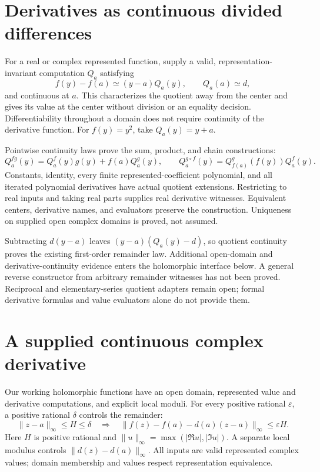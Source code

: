 \section{Derivatives as continuous divided differences}
For a real or complex represented function, supply a valid,
representation-invariant computation $Q_a$ satisfying
\[
 f(y)-f(a)\simeq(y-a)Q_a(y),\qquad Q_a(a)\simeq d,
\]
and continuous at $a$. This characterizes the quotient away from the center
and gives its value at the center without division or an equality decision.
Differentiability throughout a domain does not require continuity of the
derivative function. For $f(y)=y^2$, take $Q_a(y)=y+a$.

Pointwise continuity laws prove the sum, product, and chain constructions:
\[
 Q^{fg}_a(y)=Q^f_a(y)g(y)+f(a)Q^g_a(y),\qquad
 Q^{g\circ f}_a(y)=Q^g_{f(a)}(f(y))Q^f_a(y).
\]
Constants, identity, every finite represented-coefficient polynomial, and all
iterated polynomial derivatives have actual quotient extensions. Restricting
to real inputs and taking real parts supplies real derivative witnesses.
Equivalent centers, derivative names, and evaluators preserve the construction.
Uniqueness on supplied open complex domains is proved, not assumed.

Subtracting $d(y-a)$ leaves $(y-a)(Q_a(y)-d)$, so quotient continuity proves
the existing first-order remainder law. Additional open-domain and
derivative-continuity evidence enters the holomorphic interface below.
A general reverse constructor from arbitrary remainder witnesses has not
been proved. Reciprocal and elementary-series quotient adapters remain open;
formal derivative formulas and value evaluators alone do not provide them.

\section{A supplied continuous complex derivative}
Our working holomorphic functions have an open domain, represented value and
derivative computations, and explicit local moduli. For every positive
rational $\varepsilon$, a positive rational $\delta$ controls the remainder:
\[
 \|z-a\|_\infty\le H\le\delta
 \quad\Longrightarrow\quad
 \|f(z)-f(a)-d(a)(z-a)\|_\infty\le\varepsilon H.
\]
Here $H$ is positive rational and
$\|u\|_\infty=\max(|\Re u|,|\Im u|)$. A separate local modulus controls
$\|d(z)-d(a)\|_\infty$. All inputs are valid represented complex values;
domain membership and values respect representation equivalence.

